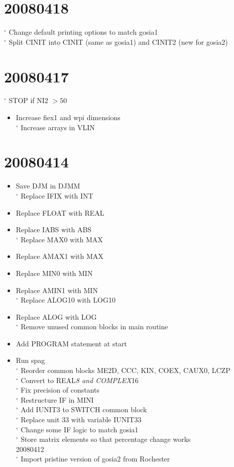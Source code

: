 \documentclass[10pt]{article}
\begin{document}
\section*{20080418}
${ }^{\circ}$ Change default printing options to match gosia1\\
${ }^{\circ}$ Split CINIT into CINIT (same as gosia1) and CINIT2 (new for gosia2)

\section*{20080417}
${ }^{\circ}$ STOP if NI2 $>50$

\begin{itemize}
  \item Increase fiex1 and wpi dimensions\\
${ }^{\circ}$ Increase arrays in VLIN
\end{itemize}

\section*{20080414}
\begin{itemize}
  \item Save DJM in DJMM\\
${ }^{\circ}$ Replace IFIX with INT
  \item Replace FLOAT with REAL
  \item Replace IABS with ABS\\
${ }^{\circ}$ Replace MAX0 with MAX
  \item Replace AMAX1 with MAX
  \item Replace MIN0 with MIN
  \item Replace AMIN1 with MIN\\
${ }^{\circ}$ Replace ALOG10 with LOG10
  \item Replace ALOG with LOG\\
${ }^{\circ}$ Remove unused common blocks in main routine
  \item Add PROGRAM statement at start
  \item Run spag\\
${ }^{\circ}$ Reorder common blocks ME2D, CCC, KIN, COEX, CAUX0, LCZP\\
${ }^{\circ}$ Convert to REAL\textit{8 and COMPLEX}16\\
${ }^{\circ}$ Fix precision of constants\\
${ }^{\circ}$ Restructure IF in MINI\\
${ }^{\circ}$ Add IUNIT3 to SWITCH common block\\
${ }^{\circ}$ Replace unit 33 with variable IUNIT33\\
${ }^{\circ}$ Change some IF logic to match gosia1\\
${ }^{\circ}$ Store matrix elements so that percentage change works\\
20080412\\
${ }^{\circ}$ Import pristine version of gosia2 from Rochester
\end{itemize}
\end{document}
